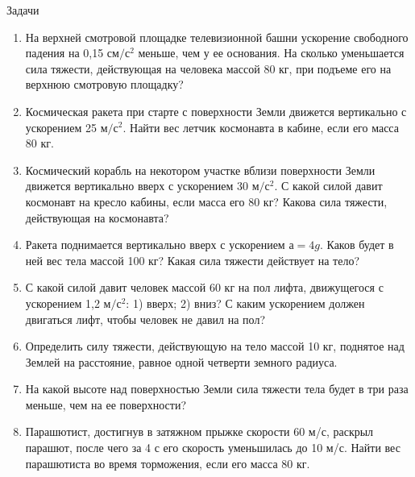 \documentclass[a5paper, 10pt]{diss_4}
\renewcommand{\'}{\,'}
\begin{document}
\begin{center}
   Задачи
\end{center}
\begin{enumerate}

\item На верхней смотровой площадке  телевизионной башни ускорение свободного падения на 0,15 $см/с^2$ меньше, чем у ее основания. На сколько уменьшается сила тяжести, действующая на человека массой 80 кг, при подъеме его на верхнюю смотровую площадку?

\item Космическая ракета при старте с поверхности Земли движется вертикально с ускорением 25 $м/с^2$. Найти вес летчик космонавта в кабине, если его масса 80 кг.

\item Космический корабль на некотором участке вблизи поверхности Земли движется вертикально вверх с ускорением 30 $м/с^2$. С какой силой давит космонавт на кресло кабины, если масса его 80 кг? Какова сила тяжести, действующая на космонавта?

\item Ракета поднимается вертикально вверх с ускорением $а = 4g$. Каков будет в ней вес тела массой 100 кг? Какая сила тяжести действует на тело?

\item С какой силой давит человек массой 60 кг на пол лифта, движущегося с ускорением 1,2 $м/с^2$: 1) вверх; 2) вниз? С каким ускорением должен двигаться лифт, чтобы человек не давил на пол?

\item Определить силу тяжести, действующую на тело массой 10 кг, поднятое над Землей на расстояние, равное одной четверти земного радиуса.

\item На какой высоте над поверхностью Земли сила тяжести тела будет в три раза меньше, чем на ее поверхности?

\item Парашютист, достигнув в затяжном прыжке скорости 60 м/с, раскрыл парашют, после чего за 4 с его скорость уменьшилась до 10 м/с. Найти вес парашютиста во время торможения, если его масса 80 кг.

\end{enumerate}
\end{document}
